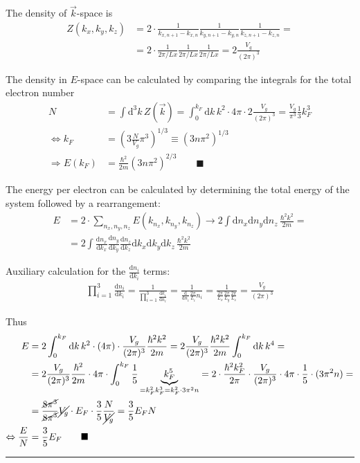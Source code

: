 \documentclass{article}
\newcommand{\diff}{\mathrm{d}}
\newcommand{\lr}[1]{\left(#1\right)}
\begin{document}
{	The density of $\vec{k}$-space is
		\begin{align*}
			Z(k_x,k_y,k_z) &= 2 \cdot \frac{1}{k_{x,n+1}-k_{x,n}} \frac{1}{k_{y,n+1}-k_{y,n}} \frac{1}{k_{z,n+1}-k_{z,n}} = \\
			&= 2\cdot \frac{1}{2\pi/Lx} \frac{1}{2\pi/Lx} \frac{1}{2\pi/Lx} = 2 \frac{V_g}{(2\pi)^3}
		\end{align*}
	
	The density in $E$-space can be calculated by comparing the integrals for the total electron number
		\begin{align*}
			N &= \int \diff^3 k \, Z(\vec{k}) = \int_0^{k_F} \diff k \, k^2 \cdot 4\pi \cdot 2 \frac{V_g}{(2\pi)^3} = \frac{V_g}{\pi^3} \frac{1}{3} k_F^3 \\
			\Leftrightarrow k_F &= \lr{ 3 \frac{N}{V_g} \pi^3 }^{1/3} \equiv \lr{ 3 n \pi^2 }^{1/3} \\
			\Rightarrow E(k_F) &= \frac{\hbar^2}{2m} \lr{ 3 n \pi^2 }^{2/3} \qquad \blacksquare
		\end{align*}

	The energy per electron can be calculated by determining the total energy of the system followed by a rearrangement:
		\begin{align*}
			E &= 2 \cdot \sum_{n_x, n_y, n_z} E(k_{n_x}, k_{n_y}, k_{n_z}) \longrightarrow 2 \int \diff n_x \diff n_y \diff n_z \, \frac{\hbar^2 k^2}{2m} = \\
			&= 2 \int \frac{\diff n_x}{\diff k_x} \frac{\diff n_y}{\diff k_y} \frac{\diff n_z}{\diff k_z} \diff k_x \diff k_y \diff k_z \, \frac{\hbar^2 k^2}{2m}
		\end{align*}
	
	Auxiliary calculation for the $\frac{\diff n_i}{\diff k_i}$ terms:
		\begin{align*}
			\prod_{i=1}^3 \frac{\diff n_i}{\diff k_i} = \frac{1}{\prod_{i=1}^3 \frac{\diff k_i}{\diff n_i}} = \frac{1}{\frac{\diff}{\diff n_i} \frac{2\pi}{L_i}n_i} = \frac{1}{\frac{2\pi}{L_x}\frac{2\pi}{L_y}\frac{2\pi}{L_z}} = \frac{V_g}{(2\pi)^3}
		\end{align*}

	Thus
		\begin{align*}
			E &= 2 \int_0^{k_F} \diff k \, k^2 \cdot (4\pi) \cdot \frac{V_g}{(2\pi)^3} \frac{\hbar^2k^2}{2m} = 2 \frac{V_g}{(2\pi)^3} \frac{\hbar^2k^2}{2m} \int_0^{k_F} \diff k \, k^4 = \\
			&= 2 \frac{V_g}{(2\pi)^3} \frac{\hbar^2}{2m} \cdot 4\pi \cdot \int_0^{k_F} \frac{1}{5} \underbrace{ k_F^5 }_{=k_F^2 k_F^3 = k_F^2 \cdot 3\pi^2n} = 2 \cdot \frac{\hbar^2k_F^2}{2\pi} \cdot \frac{V_g}{(2\pi)^3} \cdot 4\pi \cdot \frac{1}{5} \cdot (3\pi^2n) = \\
			&= \frac{ \cancel{8\pi^3} }{ \cancel{8\pi^3} } \cancel{V_g} \cdot E_F \cdot \frac{3}{5} \frac{N}{\cancel{V_g}} = \frac{3}{5} E_F N \\
			\Leftrightarrow \frac{E}{N} &= \frac{3}{5} E_F \qquad \blacksquare
		\end{align*}

\hrule
}
\end{document}
